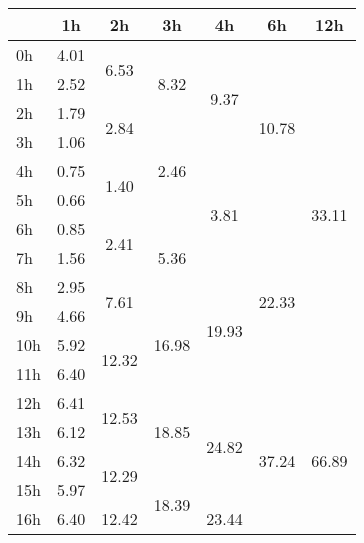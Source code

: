 \begin{center}
\begin{tabular}{l || c | c | c | c | c | c |}\hline
 & 1h & 2h & 3h & 4h & 6h & 12h \\\hline
0h & \multirow{1}{*}{ 4.01 }  & \multirow{2}{*}{ 6.53 }  & \multirow{3}{*}{ 8.32 }  & \multirow{4}{*}{ 9.37 }  & \multirow{6}{*}{ 10.78 }  & \multirow{12}{*}{ 33.11 }  \\\cline{1-1}
1h & \multirow{1}{*}{ 2.52 }  & & & & & \\\cline{1-1}\cline{2-2}
2h & \multirow{1}{*}{ 1.79 }  & \multirow{2}{*}{ 2.84 }  & & & & \\\cline{1-1}\cline{3-3}
3h & \multirow{1}{*}{ 1.06 }  & & \multirow{3}{*}{ 2.46 }  & & & \\\cline{1-1}\cline{2-2}\cline{4-4}
4h & \multirow{1}{*}{ 0.75 }  & \multirow{2}{*}{ 1.40 }  & & \multirow{4}{*}{ 3.81 }  & & \\\cline{1-1}
5h & \multirow{1}{*}{ 0.66 }  & & & & & \\\cline{1-1}\cline{2-2}\cline{3-3}\cline{5-5}
6h & \multirow{1}{*}{ 0.85 }  & \multirow{2}{*}{ 2.41 }  & \multirow{3}{*}{ 5.36 }  & & \multirow{6}{*}{ 22.33 }  & \\\cline{1-1}
7h & \multirow{1}{*}{ 1.56 }  & & & & & \\\cline{1-1}\cline{2-2}\cline{4-4}
8h & \multirow{1}{*}{ 2.95 }  & \multirow{2}{*}{ 7.61 }  & & \multirow{4}{*}{ 19.93 }  & & \\\cline{1-1}\cline{3-3}
9h & \multirow{1}{*}{ 4.66 }  & & \multirow{3}{*}{ 16.98 }  & & & \\\cline{1-1}\cline{2-2}
10h & \multirow{1}{*}{ 5.92 }  & \multirow{2}{*}{ 12.32 }  & & & & \\\cline{1-1}
11h & \multirow{1}{*}{ 6.40 }  & & & & & \\\cline{1-1}\cline{2-2}\cline{3-3}\cline{4-4}\cline{5-5}\cline{6-6}
12h & \multirow{1}{*}{ 6.41 }  & \multirow{2}{*}{ 12.53 }  & \multirow{3}{*}{ 18.85 }  & \multirow{4}{*}{ 24.82 }  & \multirow{6}{*}{ 37.24 }  & \multirow{12}{*}{ 66.89 }  \\\cline{1-1}
13h & \multirow{1}{*}{ 6.12 }  & & & & & \\\cline{1-1}\cline{2-2}
14h & \multirow{1}{*}{ 6.32 }  & \multirow{2}{*}{ 12.29 }  & & & & \\\cline{1-1}\cline{3-3}
15h & \multirow{1}{*}{ 5.97 }  & & \multirow{3}{*}{ 18.39 }  & & & \\\cline{1-1}\cline{2-2}\cline{4-4}
16h & \multirow{1}{*}{ 6.40 }  & \multirow{2}{*}{ 12.42 }  & & \multirow{4}{*}{ 23.44 }  & & \\\cline{1-1}

\end{tabular}
\end{center}
